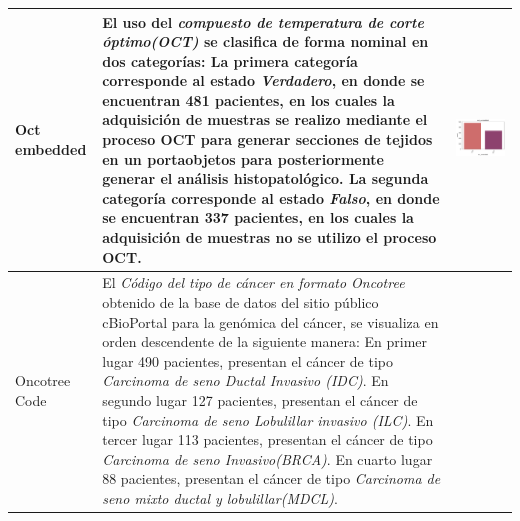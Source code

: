 \begin{table}[!htb]
	\footnotesize
	\begin{threeparttable}
		\begin{tabular}{p{2.5cm} p{7cm} p{6.5cm}} \toprule
					
			Oct embedded
			& El uso del \textit{compuesto de temperatura de corte óptimo(OCT)} se clasifica de forma nominal en dos categorías: La primera categoría corresponde al estado \textit{Verdadero}, en donde se encuentran 481 pacientes, en los cuales la adquisición de muestras se realizo mediante el proceso OCT para generar secciones de tejidos en un portaobjetos para posteriormente generar el análisis histopatológico. La segunda categoría corresponde al estado \textit{Falso}, en donde se encuentran 337 pacientes, en los cuales la adquisición de muestras no se utilizo el proceso OCT.
			& \begin{center}\includegraphics[width=1\linewidth]{NOTEBOOK/IMAGENES_DESCRIPTIVAS/30_oct_embedded}\end{center}
			\\ \hline
			
			Oncotree Code
			& El \textit{Código del tipo de cáncer en formato Oncotree} obtenido de la base de datos del sitio público cBioPortal para la genómica del cáncer, se visualiza en orden descendente de la siguiente manera: En primer lugar 490 pacientes, presentan el cáncer de tipo \textit{Carcinoma de seno Ductal Invasivo (IDC)}. En segundo lugar 127 pacientes, presentan el cáncer de tipo \textit{Carcinoma de seno Lobulillar invasivo (ILC)}. En tercer lugar 113 pacientes, presentan el cáncer de tipo \textit{Carcinoma de seno Invasivo(BRCA)}. En cuarto lugar 88 pacientes, presentan el cáncer de tipo \textit{Carcinoma de seno mixto ductal y lobulillar(MDCL)}.
			

\end{tabular}
\end{threeparttable}
\end{table}
